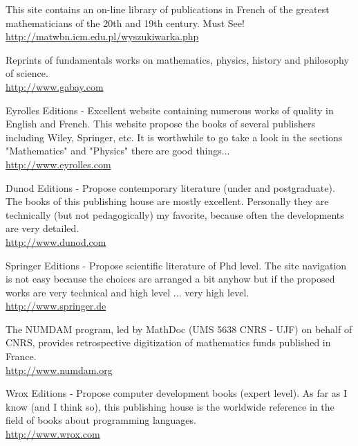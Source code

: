 	{\Large {}}\bcdfrance{} This site contains an on-line library of publications in French of the greatest mathematicians of the 20th and 19th century. Must See!\\
	\href{http://matwbn.icm.edu.pl/wyszukiwarka.php}{\color{blue}http://matwbn.icm.edu.pl/wyszukiwarka.php}
	
	{\Large {}}{\Large {}}{\Large {}}{\Large {}}\bcdfrance{} Reprints of fundamentals works on mathematics, physics, history and philosophy of science.\\
	\href{http://www.gabay.com}{\color{blue}http://www.gabay.com}
	
	\pagebreak
	{\Large {}}{\Large {}}{\Large {}}{\Large {}}\bcdfrance{} Eyrolles Editions - Excellent website containing numerous works of quality in English and French. This website propose the books of several publishers including Wiley, Springer, etc. It is worthwhile to go take a look in the sections "Mathematics" and "Physics" there are good things... \\
	\href{http://www.eyrolles.com}{\color{blue}http://www.eyrolles.com}
	
	{\Large {}}{\Large {}}{\Large {}}{\Large {}}\bcdfrance{} Dunod Editions - Propose contemporary literature (under and postgraduate). The books of this publishing house are mostly excellent. Personally they are technically (but not pedagogically) my favorite, because often the developments are very detailed.\\
	\href{http://www.dunod.com}{\color{blue}http://www.dunod.com}
	
	{\Large {}}{\Large {}} Springer Editions - Propose scientific literature of Phd level. The site navigation is not easy because the choices are arranged a bit anyhow but if the proposed works are very technical and high level ... very high level.\\
	\href{http://www.springer.de}{\color{blue}http://www.springer.de}
	
	{\Large {}}{\Large {}}{\Large {}}\bcdfrance{} The NUMDAM program, led by MathDoc (UMS 5638 CNRS - UJF) on behalf of CNRS, provides retrospective digitization of mathematics funds published in France.\\
	\href{http://www.numdam.org}{\color{blue}http://www.numdam.org}
	
	{\Large {}}{\Large {}}{\Large {}}{\Large {}} Wrox Editions - Propose computer development books (expert level). As far as I know (and I think so), this publishing house is the worldwide reference in the field of books about programming languages.\\
	\href{http://www.wrox.com}{\color{blue}http://www.wrox.com}
	
